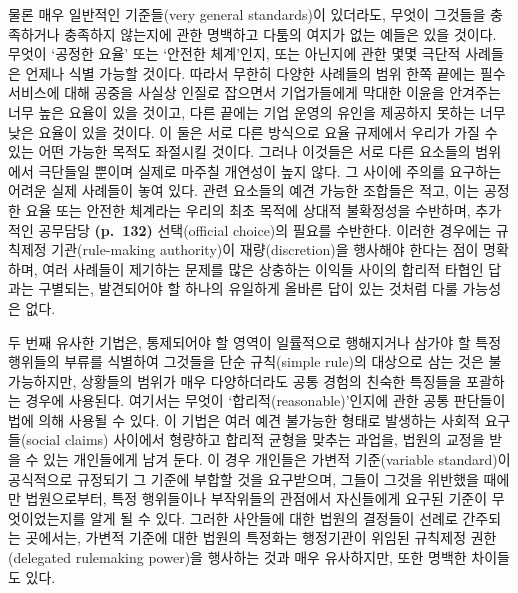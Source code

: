 물론 매우 일반적인 기준들(very general standards)이 있더라도, 무엇이
그것들을 충족하거나 충족하지 않는지에 관한 명백하고 다툼의 여지가 없는
예들은 있을 것이다. 무엇이 ‘공정한 요율’ 또는 ‘안전한 체계’인지, 또는
아닌지에 관한 몇몇 극단적 사례들은 언제나 
식별 가능할 것이다. 따라서 무한히 다양한 사례들의 범위 한쪽 끝에는 필수
서비스에 대해 공중을 사실상 인질로 잡으면서 기업가들에게 막대한 이윤을
안겨주는 너무 높은 요율이 있을 것이고, 다른 끝에는 기업 운영의 유인을
제공하지 못하는 너무 낮은 요율이 있을 것이다. 이 둘은 서로 다른 방식으로
요율 규제에서 우리가 가질 수 있는 어떤 가능한 목적도 좌절시킬 것이다.
그러나 이것들은 서로 다른 요소들의 범위에서 극단들일 뿐이며 실제로
마주칠 개연성이 높지 않다. 그 사이에 주의를 요구하는 어려운 실제
사례들이 놓여 있다. 관련 요소들의 예견 가능한 조합들은 적고, 이는 공정한
요율 또는 안전한 체계라는 우리의 최초 목적에 상대적 불확정성을 수반하며,
추가적인 공무담당 \textbf{(p.~132)} 선택(official choice)의 필요를
수반한다. 이러한 경우에는 규칙제정 기관(rule-making authority)이
재량(discretion)을 행사해야 한다는 점이 명확하며, 여러 사례들이 제기하는
문제를 많은 상충하는 이익들 사이의 합리적 타협인 답과는 구별되는,
발견되어야 할 하나의 유일하게 올바른 답이 있는 것처럼 다룰 가능성은
없다.

두 번째 유사한 기법은, 통제되어야 할 영역이 일률적으로 행해지거나 삼가야
할 특정 행위들의 부류를 식별하여 그것들을 단순 규칙(simple rule)의
대상으로 삼는 것은 불가능하지만, 상황들의 범위가 매우 다양하더라도 공통
경험의 친숙한 특징들을 포괄하는 경우에 사용된다. 여기서는 무엇이
‘합리적(reasonable)’인지에 관한 공통 판단들이 법에 의해 사용될 수 있다.
이 기법은 여러 예견 불가능한 형태로 발생하는 사회적 요구들(social
claims) 사이에서 형량하고 합리적 균형을 맞추는 과업을, 법원의 교정을
받을 수 있는 개인들에게 남겨 둔다. 이 경우 개인들은 가변적 기준(variable
standard)이 공식적으로 규정되기  그 기준에 부합할
것을 요구받으며, 그들이 그것을 위반했을 때에만  법원으로부터, 특정 행위들이나 부작위들의 관점에서 자신들에게
요구된 기준이 무엇이었는지를 알게 될 수 있다. 그러한 사안들에 대한
법원의 결정들이 선례로 간주되는 곳에서는, 가변적 기준에 대한 법원의
특정화는 행정기관이 위임된 규칙제정 권한(delegated rulemaking power)을
행사하는 것과 매우 유사하지만, 또한 명백한 차이들도 있다.

